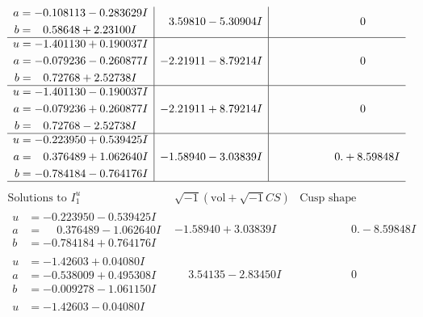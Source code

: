 \documentclass[1p]{elsarticle_modified}
\theoremstyle{definition}
\newcommand{\I}{\sqrt{-1}}
\begin{document}
$$\begin{array}{c|c|c}
\begin{aligned}
a &= -0.108113 - 0.283629 I \\
b &= \phantom{-}0.58648 + 2.23100 I\end{aligned}
 & \phantom{-}3.59810 - 5.30904 I & \phantom{-0.000000 } 0 \\ \hline\begin{aligned}
u &= -1.401130 + 0.190037 I \\
a &= -0.079236 - 0.260877 I \\
b &= \phantom{-}0.72768 + 2.52738 I\end{aligned}
 & -2.21911 - 8.79214 I & \phantom{-0.000000 } 0 \\ \hline\begin{aligned}
u &= -1.401130 - 0.190037 I \\
a &= -0.079236 + 0.260877 I \\
b &= \phantom{-}0.72768 - 2.52738 I\end{aligned}
 & -2.21911 + 8.79214 I & \phantom{-0.000000 } 0 \\ \hline\begin{aligned}
u &= -0.223950 + 0.539425 I \\
a &= \phantom{-}0.376489 + 1.062640 I \\
b &= -0.784184 - 0.764176 I\end{aligned}
 & -1.58940 - 3.03839 I & \phantom{-0.000000 -}0. + 8.59848 I\\
 \hline 
 \end{array}$$\newpage$$\begin{array}{c|c|c}  
\text{Solutions to }I^u_{1}& \I (\text{vol} + \sqrt{-1}CS) & \text{Cusp shape}\\
 \hline 
\begin{aligned}
u &= -0.223950 - 0.539425 I \\
a &= \phantom{-}0.376489 - 1.062640 I \\
b &= -0.784184 + 0.764176 I\end{aligned}
 & -1.58940 + 3.03839 I & \phantom{-0.000000 } 0. - 8.59848 I \\ \hline\begin{aligned}
u &= -1.42603 + 0.04080 I \\
a &= -0.538009 + 0.495308 I \\
b &= -0.009278 - 1.061150 I\end{aligned}
 & \phantom{-}3.54135 - 2.83450 I & \phantom{-0.000000 } 0 \\ \hline\begin{aligned}
u &= -1.42603 - 0.04080 I \\

\end{aligned}
\end{array}$$
\end{document}
